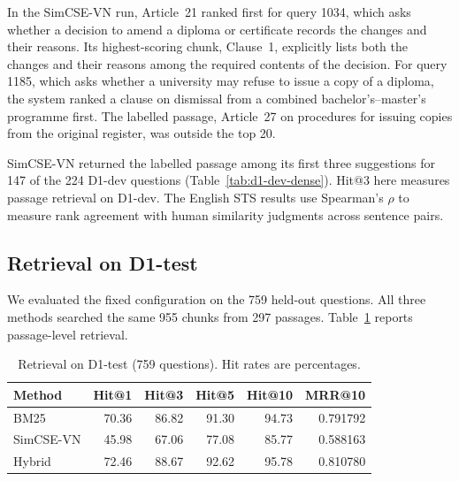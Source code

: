 In the SimCSE-VN run, Article~21 ranked first for query 1034, which asks
whether a decision to amend a diploma or certificate records the changes
and their reasons. Its highest-scoring chunk, Clause~1, explicitly lists both the
changes and their reasons among the required contents of the decision.
For query 1185, which asks whether a university may refuse to issue a copy
of a diploma, the system ranked a clause on dismissal from a combined
bachelor's--master's programme first. The labelled passage, Article~27 on
procedures for issuing copies from the original register, was outside the
top 20.

SimCSE-VN returned the labelled passage among its first three suggestions
for 147 of the 224 D1-dev questions (Table~\ref{tab:d1-dev-dense}).
Hit@3 here measures passage retrieval on D1-dev. The English STS results use
Spearman's $\rho$ to measure rank agreement with human similarity
judgments across sentence pairs.

\subsection{Retrieval on D1-test}
\label{sec:d1-test-results}
We evaluated the fixed configuration on the 759 held-out questions.
All three methods searched the same 955 chunks from 297 passages.
Table~\ref{tab:d1-test} reports passage-level retrieval.

\begin{table}[htbp]
\caption{Retrieval on D1-test (759 questions). Hit rates are percentages.}
\label{tab:d1-test}
\centering\footnotesize
\setlength{\tabcolsep}{3pt}
\begin{tabular}{@{}lrrrrr@{}}
\hline
Method & Hit@1 & Hit@3 & Hit@5 & Hit@10 & MRR@10 \\
\hline
BM25 & 70.36 & 86.82 & 91.30 & 94.73 & 0.791792 \\
SimCSE-VN & 45.98 & 67.06 & 77.08 & 85.77 & 0.588163 \\
Hybrid & 72.46 & 88.67 & 92.62 & 95.78 & 0.810780 \\
\hline
\end{tabular}
\end{table}

